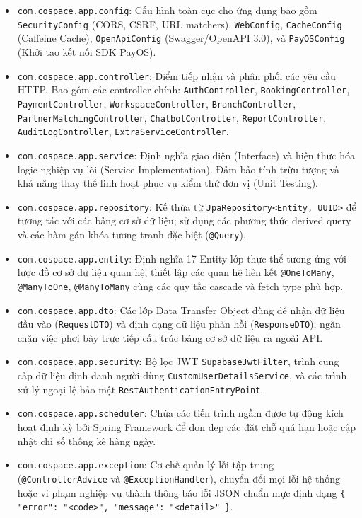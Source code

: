 \begin{itemize}
    \item \texttt{com.cospace.app.config}: Cấu hình toàn cục cho ứng dụng bao gồm \texttt{SecurityConfig} (CORS, CSRF, URL matchers), \texttt{WebConfig}, \texttt{CacheConfig} (Caffeine Cache), \texttt{OpenApiConfig} (Swagger/OpenAPI 3.0), và \texttt{PayOSConfig} (Khởi tạo kết nối SDK PayOS).
    \item \texttt{com.cospace.app.controller}: Điểm tiếp nhận và phân phối các yêu cầu HTTP. Bao gồm các controller chính: \texttt{AuthController}, \texttt{BookingController}, \texttt{PaymentController}, \texttt{WorkspaceController}, \texttt{BranchController}, \texttt{PartnerMatchingController}, \texttt{ChatbotController}, \texttt{ReportController}, \texttt{AuditLogController}, \texttt{ExtraServiceController}.
    \item \texttt{com.cospace.app.service}: Định nghĩa giao diện (Interface) và hiện thực hóa logic nghiệp vụ lõi (Service Implementation). Đảm bảo tính trừu tượng và khả năng thay thế linh hoạt phục vụ kiểm thử đơn vị (Unit Testing).
    \item \texttt{com.cospace.app.repository}: Kế thừa từ \texttt{JpaRepository<Entity, UUID>} để tương tác với các bảng cơ sở dữ liệu; sử dụng các phương thức derived query và các hàm gán khóa tương tranh đặc biệt (\texttt{@Query}).
    \item \texttt{com.cospace.app.entity}: Định nghĩa 17 Entity lớp thực thể tương ứng với lược đồ cơ sở dữ liệu quan hệ, thiết lập các quan hệ liên kết \texttt{@OneToMany}, \texttt{@ManyToOne}, \texttt{@ManyToMany} cùng các quy tắc cascade và fetch type phù hợp.
    \item \texttt{com.cospace.app.dto}: Các lớp Data Transfer Object dùng để nhận dữ liệu đầu vào (\texttt{RequestDTO}) và định dạng dữ liệu phản hồi (\texttt{ResponseDTO}), ngăn chặn việc phơi bày trực tiếp cấu trúc bảng cơ sở dữ liệu ra ngoài API.
    \item \texttt{com.cospace.app.security}: Bộ lọc JWT \texttt{SupabaseJwtFilter}, trình cung cấp dữ liệu định danh người dùng \texttt{CustomUserDetailsService}, và các trình xử lý ngoại lệ bảo mật \texttt{RestAuthenticationEntryPoint}.
    \item \texttt{com.cospace.app.scheduler}: Chứa các tiến trình ngầm được tự động kích hoạt định kỳ bởi Spring Framework để dọn dẹp các đặt chỗ quá hạn hoặc cập nhật chỉ số thống kê hàng ngày.
    \item \texttt{com.cospace.app.exception}: Cơ chế quản lý lỗi tập trung (\texttt{@ControllerAdvice} và \texttt{@ExceptionHandler}), chuyển đổi mọi lỗi hệ thống hoặc vi phạm nghiệp vụ thành thông báo lỗi JSON chuẩn mực định dạng \texttt{\{ "error": "<code>", "message": "<detail>" \}}.
\end{itemize}